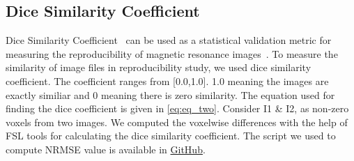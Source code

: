 \DontPrintSemicolon
{}
\hfill \break
\hfill \break
{}
\fi

\subsection{Dice Similarity Coefficient}


Dice Similarity Coefficient~\cite{ECY:ECY1945263297} can be used as a statistical validation metric for measuring the reproducibility of magnetic resonance images~\cite{Zou2004}. To measure the similarity of image files in reproducibility study, we used dice similarity coefficient. The coefficient ranges from [0.0,1.0]. 1.0 meaning the images are exactly similiar and 0 meaning there is zero similarity. The equation used for finding the dice coefficient is given in \ref{eq:eq_two}. Consider I1 \& I2, as non-zero voxels from two images. We computed the voxelwise differences with the help of FSL tools for calculating the dice similarity coefficient. The script we used to compute NRMSE value is available in \href{https://github.com/big-data-lab-team/repro-tools/blob/master/metrics/dice.sh}{GitHub}.


